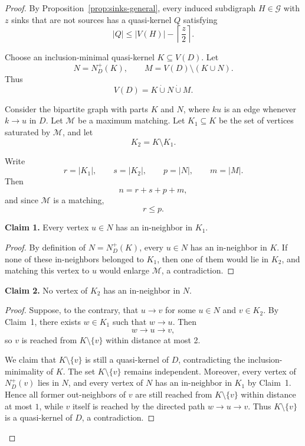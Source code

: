\documentclass[10pt,a4paper]{amsart}
\begin{document}
\begin{proof}
By Proposition~\ref{prop:sinks-general}, every induced subdigraph
\(H\in\mathcal G\) with \(z\) sinks that are not sources
has a quasi-kernel \(Q\) satisfying
\[
    |Q|
    \le
    |V(H)|-\left\lceil\frac z2\right\rceil .
\]

Choose an inclusion-minimal quasi-kernel \(K\subseteq V(D)\). Let
\[
    N=N_D^+(K),
    \qquad
    M=V(D)\setminus (K\cup N).
\]
Thus
\[
    V(D)=K\dot\cup N\dot\cup M.
\]

Consider the bipartite graph with parts \(K\) and \(N\), where
\(ku\) is an edge whenever \(k\to u\) in \(D\).
Let \(\mathcal M\) be a maximum matching.
Let \(K_1\subseteq K\) be the set of vertices saturated by \(\mathcal M\),
and let
\[
    K_2=K\setminus K_1.
\]

Write
\[
    r=|K_1|,
    \qquad
    s=|K_2|,
    \qquad
    p=|N|,
    \qquad
    m=|M|.
\]
Then
\[
    n=r+s+p+m,
\]
and since \(\mathcal M\) is a matching,
\[
    r\le p.
\]

\medskip
\noindent\textbf{Claim 1.}
Every vertex \(u\in N\) has an in-neighbor in \(K_1\).

\begin{proof}
By definition of \(N=N_D^+(K)\), every \(u\in N\) has an in-neighbor in \(K\).
If none of these in-neighbors belonged to \(K_1\), then one of them would lie
in \(K_2\), and matching this vertex to \(u\) would enlarge \(\mathcal M\),
a contradiction.
\end{proof}

\medskip
\noindent\textbf{Claim 2.}
No vertex of \(K_2\) has an in-neighbor in \(N\).

\begin{proof}
Suppose, to the contrary, that \(u\to v\) for some \(u\in N\) and
\(v\in K_2\). By Claim~1, there exists \(w\in K_1\) such that \(w\to u\).
Then
\[
    w\to u\to v,
\]
so \(v\) is reached from \(K\setminus\{v\}\) within distance at most 2.

We claim that \(K\setminus\{v\}\) is still a quasi-kernel of \(D\),
contradicting the inclusion-minimality of \(K\).
The set \(K\setminus\{v\}\) remains independent.
Moreover, every vertex of \(N_D^+(v)\) lies in \(N\), and every vertex of \(N\)
has an in-neighbor in \(K_1\) by Claim~1. Hence all former out-neighbors of
\(v\) are still reached from \(K\setminus\{v\}\) within distance at most \(1\),
while \(v\) itself is reached by the directed path \(w\to u\to v\).
Thus \(K\setminus\{v\}\) is a quasi-kernel of \(D\), a contradiction.
\end{proof}


\end{proof}
\end{document}
